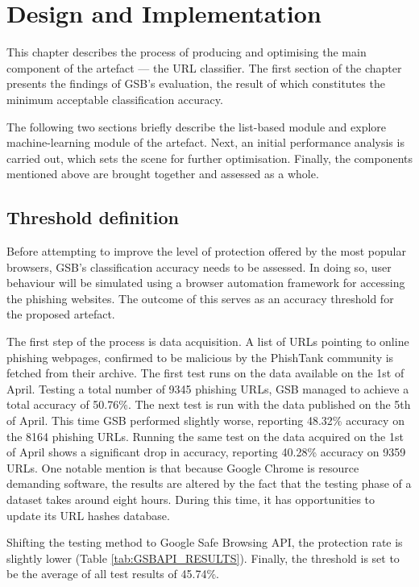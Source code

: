 
\chapter{Design and Implementation}
This chapter describes the process of producing and optimising the main component of the artefact --- the URL classifier. The first section of the chapter presents the findings of GSB's evaluation, the result of which constitutes the minimum acceptable classification accuracy.

The following two sections briefly describe the list-based module and explore machine-learning module of the artefact. Next, an initial performance analysis is carried out, which sets the scene for further optimisation. Finally, the components mentioned above are brought together and assessed as a whole.

\section{Threshold definition}
Before attempting to improve the level of protection offered by the most popular browsers, GSB's classification accuracy needs to be assessed. In doing so, user behaviour will be simulated using a browser automation framework for accessing the phishing websites. The outcome of this serves as an accuracy threshold for the proposed artefact.

The first step of the process is data acquisition. A list of URLs pointing to online phishing webpages, confirmed to be malicious by the PhishTank community is fetched from their archive. The first test runs on the data available on the 1st of April. Testing a total number of 9345 phishing URLs, GSB managed to achieve a total accuracy of 50.76\%.
The next test is run with the data published on the 5th of April. This time GSB performed slightly worse, reporting 48.32\% accuracy on the 8164 phishing URLs. Running the same test on the data acquired on the 1st of April shows a significant drop in accuracy, reporting 40.28\% accuracy on 9359 URLs.
One notable mention is that because Google Chrome is resource demanding software, the results are altered by the fact that the testing phase of a dataset takes around eight hours. During this time, it has opportunities to update its URL hashes database.

Shifting the testing method to Google Safe Browsing API, the protection rate is slightly lower (Table \ref{tab:GSBAPI_RESULTS}). Finally, the threshold is set to be the average of all test results of 45.74\%.


